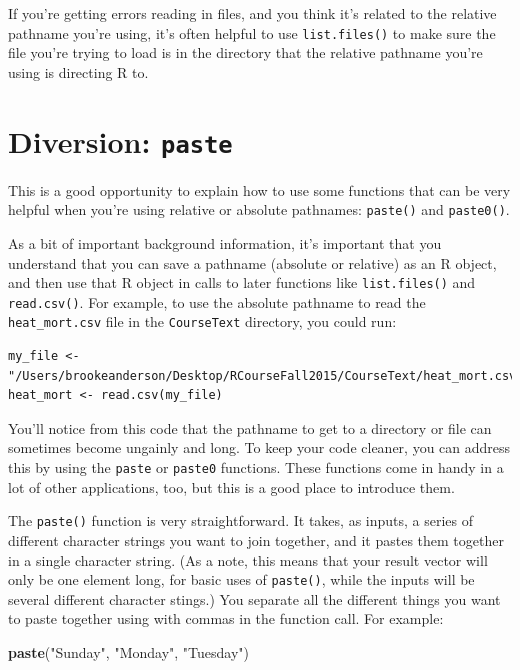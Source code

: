 \documentclass[]{book}
\makeatletter
\newenvironment{Shaded}{\begin{snugshade}}{\end{snugshade}}
\newcommand{\KeywordTok}[1]{\textcolor[rgb]{0.13,0.29,0.53}{\textbf{#1}}}
\newcommand{\StringTok}[1]{\textcolor[rgb]{0.31,0.60,0.02}{#1}}
\newcommand{\NormalTok}[1]{#1}
\newenvironment{kframe}{%
\medskip{}
\setlength{\fboxsep}{.8em}
 \def\at@end@of@kframe{}%
 \ifinner\ifhmode%
  \def\at@end@of@kframe{\end{minipage}}%
  \begin{minipage}{\columnwidth}%
 \fi\fi%
 \def\FrameCommand##1{\hskip\@totalleftmargin \hskip-\fboxsep
 \colorbox{shadecolor}{##1}\hskip-\fboxsep
     \hskip-\linewidth \hskip-\@totalleftmargin \hskip\columnwidth}%
 \MakeFramed {\advance\hsize-\width
   \@totalleftmargin\z@ \linewidth\hsize
   \@setminipage}}%
 {\par\unskip\endMakeFramed%
 \at@end@of@kframe}
\renewenvironment{Shaded}{\begin{kframe}}{\end{kframe}}
\theoremstyle{definition}
\theoremstyle{definition}
\theoremstyle{definition}
\theoremstyle{remark}
\makeatother
\begin{document}
If you're getting errors reading in files, and you think it's related to
the relative pathname you're using, it's often helpful to use
\texttt{list.files()} to make sure the file you're trying to load is in
the directory that the relative pathname you're using is directing R to.

\section{\texorpdfstring{Diversion:
\texttt{paste}}{Diversion: paste}}\label{diversion-paste}

This is a good opportunity to explain how to use some functions that can
be very helpful when you're using relative or absolute pathnames:
\texttt{paste()} and \texttt{paste0()}.

As a bit of important background information, it's important that you
understand that you can save a pathname (absolute or relative) as an R
object, and then use that R object in calls to later functions like
\texttt{list.files()} and \texttt{read.csv()}. For example, to use the
absolute pathname to read the \texttt{heat\_mort.csv} file in the
\texttt{CourseText} directory, you could run:

\begin{verbatim}
my_file <- "/Users/brookeanderson/Desktop/RCourseFall2015/CourseText/heat_mort.csv"
heat_mort <- read.csv(my_file)
\end{verbatim}

You'll notice from this code that the pathname to get to a directory or
file can sometimes become ungainly and long. To keep your code cleaner,
you can address this by using the \texttt{paste} or \texttt{paste0}
functions. These functions come in handy in a lot of other applications,
too, but this is a good place to introduce them.

The \texttt{paste()} function is very straightforward. It takes, as
inputs, a series of different character strings you want to join
together, and it pastes them together in a single character string. (As
a note, this means that your result vector will only be one element
long, for basic uses of \texttt{paste()}, while the inputs will be
several different character stings.) You separate all the different
things you want to paste together using with commas in the function
call. For example:

\begin{Shaded}
\begin{Highlighting}[]
\KeywordTok{paste}\NormalTok{(}\StringTok{"Sunday"}\NormalTok{, }\StringTok{"Monday"}\NormalTok{, }\StringTok{"Tuesday"}\NormalTok{)}
\end{Highlighting}
\end{Shaded}
\end{document}
